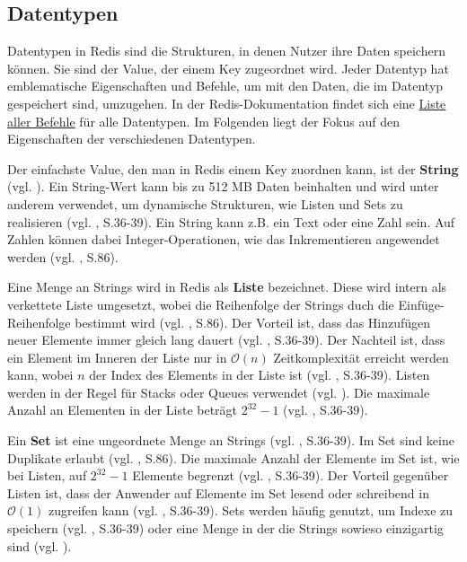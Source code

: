 
\subsection{Datentypen}
\label{subsec:datentypen}

Datentypen in \ac{Redis} sind die Strukturen, in denen Nutzer ihre Daten speichern können. Sie sind der Value, der einem Key zugeordnet wird. Jeder Datentyp hat emblematische Eigenschaften und Befehle, um mit den Daten, die im Datentyp gespeichert sind, umzugehen. In der \ac{Redis}-Dokumentation findet sich eine \href{https://redis.io/commands}{Liste aller Befehle} für alle Datentypen. Im Folgenden liegt der Fokus auf den Eigenschaften der verschiedenen Datentypen. 

Der einfachste Value, den man in \ac{Redis} einem Key zuordnen kann, ist der \textbf{String} (vgl. \cite{Redis-Docs-String}). Ein String-Wert kann bis zu 512 MB Daten beinhalten und wird unter anderem verwendet, um dynamische Strukturen, wie Listen und Sets zu realisieren (vgl. \cite{4}, S.36-39). Ein String kann z.B. ein Text oder eine Zahl sein. Auf Zahlen können dabei Integer-Operationen, wie das Inkrementieren angewendet werden (vgl. \cite{nosql}, S.86).

Eine Menge an Strings wird in \ac{Redis} als \textbf{Liste} bezeichnet. Diese wird intern als verkettete Liste umgesetzt, wobei die Reihenfolge der Strings duch die Einfüge-Reihenfolge bestimmt wird (vgl. \cite{nosql}, S.86). Der Vorteil ist, dass das Hinzufügen neuer Elemente immer gleich lang dauert (vgl. \cite{4}, S.36-39). Der Nachteil ist, dass ein Element im Inneren der Liste nur in $\mathcal{O}(n)$ Zeitkomplexität erreicht werden kann, wobei $n$ der Index des Elements in der Liste ist (vgl. \cite{4}, S.36-39). Listen werden in der Regel für Stacks oder Queues verwendet (vgl. \cite{Redis-Docs-List}). Die maximale Anzahl an Elementen in der Liste beträgt $2^{32} - 1$ (vgl. \cite{4}, S.36-39).

Ein \textbf{Set} ist eine ungeordnete Menge an Strings (vgl. \cite{4}, S.36-39). Im Set sind keine Duplikate erlaubt (vgl. \cite{nosql}, S.86). Die maximale Anzahl der Elemente im Set ist, wie bei Listen, auf $2^{32} - 1$ Elemente begrenzt (vgl. \cite{4}, S.36-39). Der Vorteil gegenüber Listen ist, dass der Anwender auf Elemente im Set lesend oder schreibend in $\mathcal{O}(1)$ zugreifen kann (vgl. \cite{4}, S.36-39). Sets werden häufig genutzt, um Indexe zu speichern (vgl. \cite{4}, S.36-39) oder eine Menge in der die Strings sowieso einzigartig sind (vgl. \cite{Redis-Docs-Set}).


